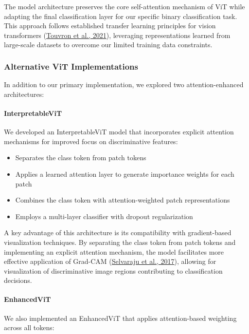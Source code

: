 \documentclass[a4paper,12pt]{report}
\begin{document}
The model architecture preserves the core self-attention mechanism of ViT while adapting the final classification layer for our specific binary classification task. This approach follows established transfer learning principles for vision transformers (\href{https://arxiv.org/abs/2012.12877}{Touvron et al., 2021}), leveraging representations learned from large-scale datasets to overcome our limited training data constraints.

\subsubsection{Alternative ViT Implementations}

In addition to our primary implementation, we explored two attention-enhanced architectures:

\paragraph{InterpretableViT}
We developed an InterpretableViT model that incorporates explicit attention mechanisms for improved focus on discriminative features:

\begin{itemize}
    \item Separates the class token from patch tokens
    \item Applies a learned attention layer to generate importance weights for each patch
    \item Combines the class token with attention-weighted patch representations
    \item Employs a multi-layer classifier with dropout regularization
\end{itemize}

A key advantage of this architecture is its compatibility with gradient-based visualization techniques. By separating the class token from patch tokens and implementing an explicit attention mechanism, the model facilitates more effective application of Grad-CAM (\href{https://arxiv.org/abs/1610.02391}{Selvaraju et al., 2017}), allowing for visualization of discriminative image regions contributing to classification decisions.

\paragraph{EnhancedViT}
We also implemented an EnhancedViT that applies attention-based weighting across all tokens:
\end{document}
